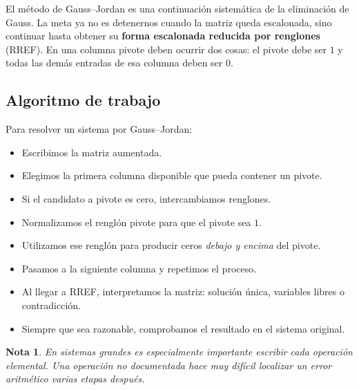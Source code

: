\documentclass[12pt]{article}
\newtheorem{Nota}[definicion]{Nota}
\theoremstyle{remark}
\begin{document}
El método de Gauss--Jordan es una continuación sistemática de la eliminación de Gauss. La meta ya no es detenernos cuando la matriz queda escalonada, sino continuar hasta obtener su \textbf{forma escalonada reducida por renglones} (RREF). En una columna pivote deben ocurrir dos cosas: el pivote debe ser \(1\) y todas las demás entradas de esa columna deben ser \(0\).
\subsection*{Algoritmo de trabajo}
Para resolver un sistema por Gauss--Jordan:

\begin{itemize}
\item Escribimos la matriz aumentada.
\item Elegimos la primera columna disponible que pueda contener un pivote.
\item Si el candidato a pivote es cero, intercambiamos renglones.
\item Normalizamos el renglón pivote para que el pivote sea \(1\).
\item Utilizamos ese renglón para producir ceros \emph{debajo y encima} del pivote.
\item Pasamos a la siguiente columna y repetimos el proceso.
\item Al llegar a RREF, interpretamos la matriz: solución única, variables libres o contradicción.
\item Siempre que sea razonable, comprobamos el resultado en el sistema original.
\end{itemize}

\begin{Nota}
En sistemas grandes es especialmente importante escribir cada operación elemental. Una operación no documentada hace muy difícil localizar un error aritmético varias etapas después.
\end{Nota}

\end{document}
